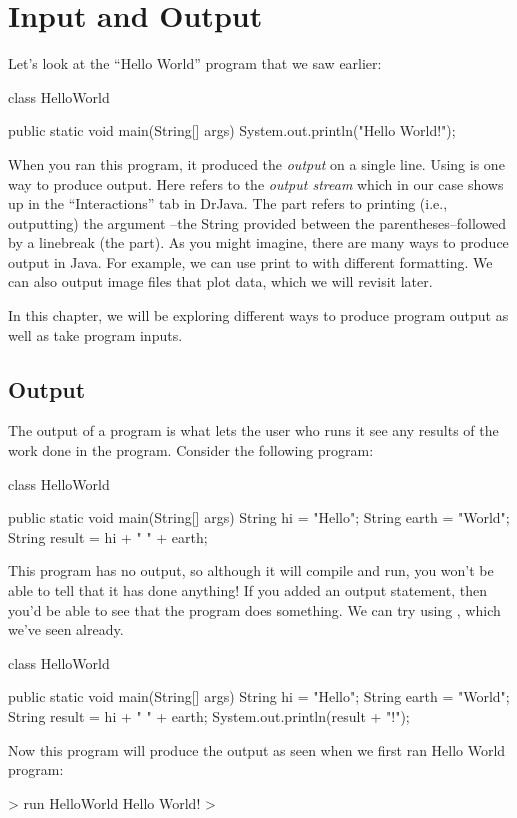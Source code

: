 \chapter{Input and Output}

Let's look at the ``Hello World'' program that we saw earlier:
\begin{code}
class HelloWorld {

    public static void main(String[] args) {
        System.out.println("Hello World!");
    }

}
\end{code}

When you ran this program, it produced the \emph{output}  on a single line.
Using  is one way to
produce output. Here  refers to the \emph{output stream}
which in our case shows up in the ``Interactions'' tab in DrJava.
The  part refers to printing (i.e., outputting) the argument
--the String provided between the parentheses--followed by a linebreak (the  part).
As you might imagine, there are many ways to produce output in Java. For example, we can use print to  with different formatting. We can also output image files that
plot data, which we will revisit later. 

In this chapter, we will be exploring different ways to produce program output
as well as take program inputs.

\section{Output}
The output of a program is what lets the user who runs it
see any results of the work done in the program.
Consider the following program:
\begin{code}
class HelloWorld {

    public static void main(String[] args) {
        String hi = "Hello";
        String earth = "World";
        String result = hi + " " + earth;
    }

}
\end{code}
This program has no output, so although it will compile and run, you won't
be able to tell that it has done anything!
If you added an output statement, then you'd be able to see that
the program does something. We can try using ,
which we've seen already.
\begin{code}
class HelloWorld {

    public static void main(String[] args) {
        String hi = "Hello";
        String earth = "World";
        String result = hi + " " + earth;
        System.out.println(result + "!");
    }

}
\end{code}
Now this program will produce the output as seen when we first ran Hello World program:
\begin{code}
> run HelloWorld
Hello World!
>
\end{code}


